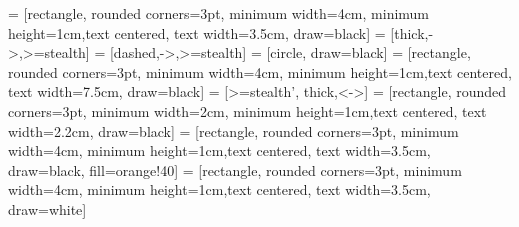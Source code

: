 \usetikzlibrary{shapes, arrows}

 = [rectangle, rounded corners=3pt, minimum width=4cm, minimum height=1cm,text centered, text width=3.5cm, draw=black]
 = [thick,->,>=stealth]
 = [dashed,->,>=stealth]
 = [circle, draw=black]
 = [rectangle, rounded corners=3pt, minimum width=4cm, minimum height=1cm,text centered, text width=7.5cm, draw=black]
 = [>=stealth', thick,<->]
 = [rectangle, rounded corners=3pt, minimum width=2cm, minimum height=1cm,text centered, text width=2.2cm, draw=black]
 = [rectangle, rounded corners=3pt, minimum width=4cm, minimum height=1cm,text centered, text width=3.5cm, draw=black, fill=orange!40]
 = [rectangle, rounded corners=3pt, minimum width=4cm, minimum height=1cm,text centered, text width=3.5cm, draw=white]

